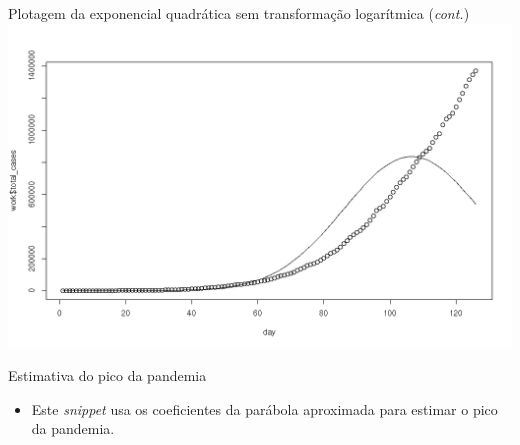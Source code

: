 \documentclass[a4paper,10pt]{beamer}
\begin{document}
\begin{frame}{ Plotagem da exponencial quadrática sem transformação logarítmica
      ({\em cont.})}
  \includegraphics[scale=0.375]{plot-unexp2.png}

\end{frame}

\begin{frame}{ Estimativa do pico da pandemia }
  
  
  \begin{itemize}
      \item Este {\em snippet} usa os coeficientes da parábola aproximada para 
	  estimar o pico da pandemia.
  \end{itemize}

\end{frame}
\end{document}
